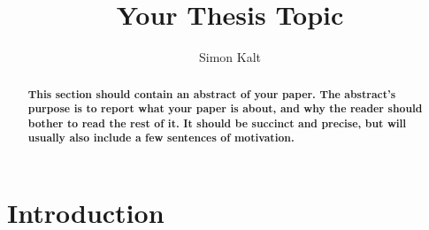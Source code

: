 \documentclass[twocolumn, a4paper, 10pt]{article}
\begin{document}
\title{\Large Your Thesis Topic}

\author{
	Simon Kalt
}

\maketitle

\def\abstractname{{\textbf Abstract}}
\begin{abstract}
{
\bfseries
 This section should contain an abstract of your paper. The abstract's purpose is to report what your paper is about, and why the reader should bother to read the rest of it. It should be succinct and precise, but will usually also include a few sentences of motivation.
}
\end{abstract}


\section{Introduction}
\lipsum[1-3]



{
	
	
}

\appendix
\end{document}
